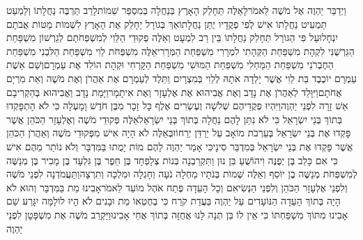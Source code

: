 \documentclass[../main/main.tex]{subfiles}
\begin{document}
\begin{multicols}{\ncols}
וַיְדַבֵּר יַהְוֶה אֶל מֹשֶׁה לֵּאמֹר\PreVerseSpace{}לָאֵלֶּה תֵּחָלֵק הָאָרֶץ בְּנַחֲלָה בְּמִסְפַּר שֵׁמוֹת\PreVerseSpace{}לָרַב תַּרְבֶּה נַחֲלָתוֹ וְלַמְעַט תַּמְעִיט נַחֲלָתוֹ אִישׁ לְפִי פְקֻדָיו יֻתַּן נַחֲלָתוֹ\PreVerseSpace{}אַךְ בְּגוֹרָל יֵחָלֵק אֶת הָאָרֶץ לִשְׁמוֹת מַטּוֹת אֲבֹתָם יִנְחָלוּ\PreVerseSpace{}עַל פִּי הַגּוֹרָל תֵּחָלֵק נַחֲלָתוֹ בֵּין רַב לִמְעָט \ClosedSection{}וְאֵלֶּה פְקוּדֵי הַלֵּוִי לְמִשְׁפְּחֹתָם לְגֵרְשׁוֹן מִשְׁפַּחַת הַגֵּרְשֻׁנִּי לִקְהָת מִשְׁפַּחַת הַקְּהָתִי לִמְרָרִי מִשְׁפַּחַת הַמְּרָרִי\PreVerseSpace{}אֵלֶּה מִשְׁפְּחֹת לֵוִי מִשְׁפַּחַת הַלִּבְנִי מִשְׁפַּחַת הַחֶבְרֹנִי מִשְׁפַּחַת הַמַּחְלִי מִשְׁפַּחַת הַמּוּשִׁי מִשְׁפַּחַת הַקָּרְחִי וּקְהָת הוֹלִד אֶת עַמְרָם\PreVerseSpace{}וְשֵׁם אֵשֶׁת עַמְרָם יוֹכֶבֶד בַּת לֵוִי אֲשֶׁר יָלְדָה אֹתָהּ לְלֵוִי בְּמִצְרָיִם וַתֵּלֶד לְעַמְרָם אֶת אַהֲרֹן וְאֶת מֹשֶׁה וְאֵת מִרְיָם אֲחֹתָם\PreVerseSpace{}וַיִּוָּלֵד לְאַהֲרֹן אֶת נָדָב וְאֶת אֲבִיהוּא אֶת אֶלְעָזָר וְאֶת אִיתָמָר\PreVerseSpace{}וַיָּמָת נָדָב וַאֲבִיהוּא בְּהַקְרִיבָם אֵשׁ זָרָה לִפְנֵי יַהְוֶה\PreVerseSpace{}וַיִּהְיוּ פְקֻדֵיהֶם שְׁלֹשָׁה וְעֶשְׂרִים אֶלֶף כָּל זָכָר מִבֶּן חֹדֶשׁ וָמָעְלָה כִּי לֹא הָתְפָּקְדוּ בְּתוֹךְ בְּנֵי יִשְׂרָאֵל כִּי לֹא נִתַּן לָהֶם נַחֲלָה בְּתוֹךְ בְּנֵי יִשְׂרָאֵל\PreVerseSpace{}אֵלֶּה פְּקוּדֵי מֹשֶׁה וְאֶלְעָזָר הַכֹּהֵן אֲשֶׁר פָּקְדוּ אֶת בְּנֵי יִשְׂרָאֵל בְּעַרְבֹת מוֹאָב עַל יַרְדֵּן יְרֵחוֹ\PreVerseSpace{}וּבְאֵלֶּה לֹא הָיָה אִישׁ מִפְּקוּדֵי מֹשֶׁה וְאַהֲרֹן הַכֹּהֵן אֲשֶׁר פָּקְדוּ אֶת בְּנֵי יִשְׂרָאֵל בְּמִדְבַּר סִינָי\PreVerseSpace{}כִּי אָמַר יַהְוֶה לָהֶם מוֹת יָמֻתוּ בַּמִּדְבָּר וְלֹא נוֹתַר מֵהֶם אִישׁ כִּי אִם כָּלֵב בֶּן יְפֻנֶּה וִיהוֹשֻׁעַ בִּן נוּן \ClosedSection{}וַתִּקְרַבְנָה בְּנוֹת צְלָפְחָד בֶּן חֵפֶר בֶּן גִּלְעָד בֶּן מָכִיר בֶּן מְנַשֶּׁה לְמִשְׁפְּחֹת מְנַשֶּׁה בֶן יוֹסֵף וְאֵלֶּה שְׁמוֹת בְּנֹתָיו מַחְלָה נֹעָה וְחָגְלָה וּמִלְכָּה וְתִרְצָה\PreVerseSpace{}וַתַּעֲמֹדְנָה לִפְנֵי מֹשֶׁה וְלִפְנֵי אֶלְעָזָר הַכֹּהֵן וְלִפְנֵי הַנְּשִׂיאִם וְכָל הָעֵדָה פֶּתַח אֹהֶל מוֹעֵד לֵאמֹר\PreVerseSpace{}אָבִינוּ מֵת בַּמִּדְבָּר וְהוּא לֹא הָיָה בְּתוֹךְ הָעֵדָה הַנּוֹעָדִים עַל יַהְוֶה בַּעֲדַת קֹרַח כִּי בְחֶטְאוֹ מֵת וּבָנִים לֹא הָיוּ לוֹ\PreVerseSpace{}לָמָּה יִגָּרַע שֵׁם אָבִינוּ מִתּוֹךְ מִשְׁפַּחְתּוֹ כִּי אֵין לוֹ בֵּן תְּנָה לָּנוּ אֲחֻזָּה בְּתוֹךְ אֲחֵי אָבִינוּ\PreVerseSpace{}וַיַּקְרֵב מֹשֶׁה אֶת מִשְׁפָּטָן לִפְנֵי יַהְוֶה\OpenSection{}\par

\end{multicols}
\end{document}
